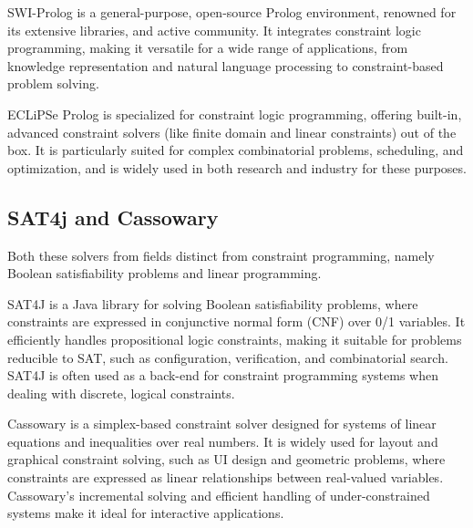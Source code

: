 SWI-Prolog is a general-purpose, open-source Prolog environment, renowned for its extensive libraries, and active community. 
It integrates constraint logic programming, making it versatile for a wide range of applications, from knowledge representation and natural language processing to constraint-based problem solving.

ECLiPSe Prolog is specialized for constraint logic programming, offering built-in, advanced constraint solvers (like finite domain and linear constraints) out of the box. It is particularly suited for complex combinatorial problems, scheduling, and optimization, and is widely used in both research and industry for these purposes.

\subsection{SAT4j and Cassowary}
Both these solvers from fields distinct from constraint programming, namely Boolean satisfiability problems and linear programming.

SAT4J is a Java library for solving Boolean satisfiability problems, where constraints are expressed in conjunctive normal form (CNF) over 0/1 variables. 
It efficiently handles propositional logic constraints, making it suitable for problems reducible to SAT, such as configuration, verification, and combinatorial search. 
SAT4J is often used as a back-end for constraint programming systems when dealing with discrete, logical constraints.

Cassowary is a simplex-based constraint solver designed for systems of linear equations and inequalities over real numbers.
It is widely used for layout and graphical constraint solving, such as UI design and geometric problems, where constraints are expressed as linear relationships between real-valued variables. 
Cassowary’s incremental solving and efficient handling of under-constrained systems make it ideal for interactive applications.